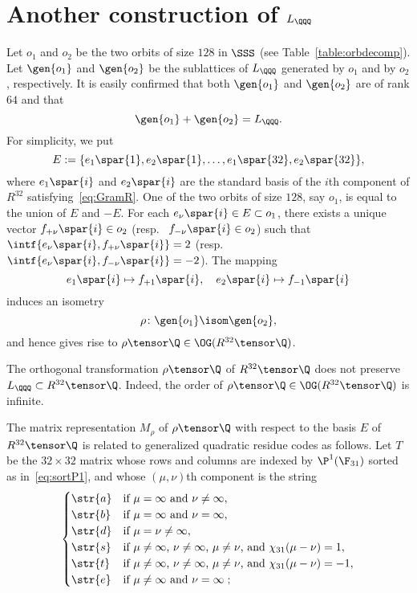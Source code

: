 \documentclass{amsart}
\begin{document}
\section{Another construction of $L_{\QQQ}$}
%
Let $o_1$ and $o_2$ be the two orbits of size $128$ in $\SSS$
(see Table~\ref{table:orbdecomp}).
Let $\gen{o_1}$ and $\gen{o_2}$ be the sublattices of $L_{\QQQ}$ generated 
by $o_1$ and by $o_2$, respectively.
It is easily confirmed that both $\gen{o_1}$ and $\gen{o_2}$ are of rank $64$ and that
%
\begin{equation}\label{eq:orbitssum}
\gen{o_1}+\gen{o_2}=L_{\QQQ}.
\end{equation}
%
For simplicity, we put
$$
E:=\{e_1\spar{1}, e_2\spar{1}, \dots, e_1\spar{32}, e_2\spar{32}\},
$$
where $e_1\spar{i}$ and $e_2\spar{i}$ are the standard basis of the $i$th component  of $R^{32}$ satisfying~\eqref{eq:GramR}.
One of the two orbits of size $128$, say $o_1$,
is equal to the union of $E$ and $-E$.
For each $e_{\nu}\spar{i}\in E\subset o_1$,
there exists a unique vector $f_{+\nu}\spar{i}\in o_2$ (resp.~ $f_{-\nu}\spar{i}\in o_2$) such that
$\intf{e_{\nu}\spar{i}, f_{+\nu}\spar{i}}=2$ (resp.~ $\intf{e_{\nu}\spar{i}, f_{-\nu}\spar{i}}=-2$).
The mapping
$$
e_{1}\spar{i}\mapsto  f_{+1}\spar{i}, \quad e_{2}\spar{i}\mapsto  f_{-1}\spar{i}
$$
induces an isometry
$$
\rho\colon \gen{o_1}\isom \gen{o_2},
$$
and hence gives rise to $\rho\tensor\Q\in \OG(R^{32}\tensor\Q)$.
\begin{remark}
The orthogonal transformation  $\rho\tensor\Q$ of $R^{32}\tensor\Q$
does not preserve $L_{\QQQ}\subset R^{32}\tensor\Q$.
Indeed, the order of   $\rho\tensor\Q\in \OG(R^{32}\tensor\Q)$ is infinite.
\end{remark}
%
The matrix representation $M_{\rho}$ of $\rho\tensor\Q$ with respect to the basis $E$ of $R^{32}\tensor\Q$
is related to generalized quadratic residue codes   as follows.
%
Let
$T$ be the $32\times 32$ matrix whose rows and columns are indexed by $\P^1(\F_{31})$
sorted as in~\eqref{eq:sortP1}, 
and whose $(\mu, \nu)$th component is the string  
%
$$
\begin{cases}
\str{a} & \textrm{if $\mu=\infty$ and $\nu\ne \infty$},\\
\str{b} & \textrm{if $\mu=\infty$ and $\nu=\infty$},\\
\str{d} & \textrm{if $\mu=\nu\ne \infty$}, \\
\str{s} & \textrm{if $\mu\ne\infty$, $\nu\ne\infty$, $\mu\ne\nu$,  and  $\chi_{31}(\mu-\nu)=1$}, \\
\str{t} & \textrm{if $\mu\ne\infty$, $\nu\ne\infty$, $\mu\ne\nu$,  and  $\chi_{31}(\mu-\nu)=-1$}, \\
\str{e} & \textrm{if $\mu\ne\infty$ and $\nu=\infty$}\; ; 
\end{cases}
$$
\end{document}
